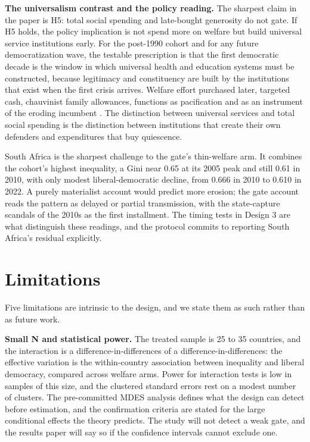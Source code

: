 \documentclass[11pt,letterpaper]{article}
\begin{document}
\textbf{The universalism contrast and the policy reading.} The sharpest claim in the paper is H5: total social spending and late-bought generosity do not gate. If H5 holds, the policy implication is not spend more on welfare but build universal service institutions early. For the post-1990 cohort and for any future democratization wave, the testable prescription is that the first democratic decade is the window in which universal health and education systems must be constructed, because legitimacy and constituency are built by the institutions that exist when the first crisis arrives. Welfare effort purchased later, targeted cash, chauvinist family allowances, functions as pacification \citep{Vanhuysse2006} and as an instrument of the eroding incumbent \citep{SzikraOktem2023, LendvaiBainton2021, Benczes2024}. The distinction between universal services and total social spending is the distinction between institutions that create their own defenders \citep{Pierson1993, SossSchram2007, RothsteinUslaner2005, KorpiPalme1998} and expenditures that buy quiescence.

South Africa is the sharpest challenge to the gate's thin-welfare arm. It combines the cohort's highest inequality, a Gini near 0.65 at its 2005 peak and still 0.61 in 2010, with only modest liberal-democratic decline, from 0.666 in 2010 to 0.610 in 2022. A purely materialist account would predict more erosion; the gate account reads the pattern as delayed or partial transmission, with the state-capture scandals of the 2010s as the first installment. The timing tests in Design 3 are what distinguish these readings, and the protocol commits to reporting South Africa's residual explicitly.

\section{Limitations}

Five limitations are intrinsic to the design, and we state them as such rather than as future work.

\textbf{Small N and statistical power.} The treated sample is 25 to 35 countries, and the interaction is a difference-in-differences of a difference-in-differences: the effective variation is the within-country association between inequality and liberal democracy, compared across welfare arms. Power for interaction tests is low in samples of this size, and the clustered standard errors rest on a modest number of clusters. The pre-committed MDES analysis defines what the design can detect before estimation, and the confirmation criteria are stated for the large conditional effects the theory predicts. The study will not detect a weak gate, and the results paper will say so if the confidence intervals cannot exclude one.
\end{document}
